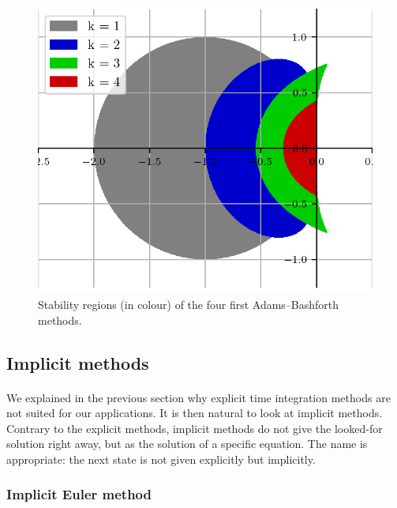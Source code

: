        \begin{figure}
          \centering
          \includegraphics{figures/ab_stab.png}
          \caption{Stability regions (in colour) of the four first Adams--Bashforth methods.}
          \label{fig:ab_stab}
        \end{figure}


    \subsection{Implicit methods}

      \paragraph{}
      We explained in the previous section why explicit time integration methods are not suited for our applications.
      It is then natural to look at implicit methods.
      Contrary to the explicit methods, implicit methods do not give the looked-for solution right away, but as the solution of a specific equation.
      The name is appropriate: the next state is not given explicitly but implicitly.


      \subsubsection{Implicit Euler method}

